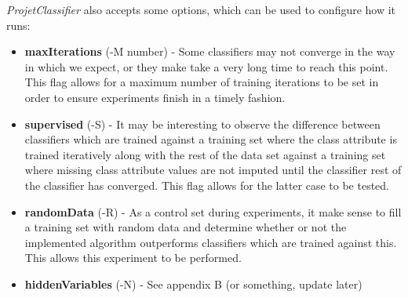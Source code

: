 \textit{ProjetClassifier} also accepts some options, which can be used to configure how it runs:
\begin{itemize}
\item \textbf{maxIterations} (-M number) - Some classifiers may not converge in the way in which we expect, or they make take a very long time to reach this point. This flag allows for a maximum number of training iterations to be set in order to ensure experiments finish in a timely fashion.
\item \textbf{supervised} (-S) - It may be interesting to observe the difference between classifiers which are trained against a training set where the class attribute is trained iteratively along with the rest of the data set against a training set where missing class attribute values are not imputed until the classifier rest of the classifier has converged. This flag allows for the latter case to be tested.
\item \textbf{randomData} (-R) - As a control set during experiments, it make sense to fill a training set with random data and determine whether or not the implemented algorithm outperforms classifiers which are trained against this. This allows this experiment to be performed.
\item \textbf{hiddenVariables} (-N) - See appendix B (or something, update later)
\end{itemize}

